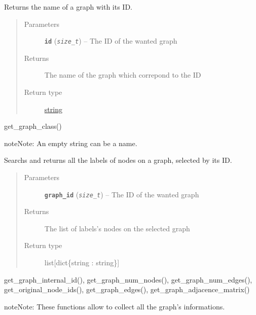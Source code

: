 \documentclass[letterpaper,10pt,english]{sphinxmanual}
\begin{document}

\begin{fulllineitems}
\label{doc:gedlibpy.get_graph_name}
Returns the name of a graph with its ID.
\begin{quote}\begin{description}
\item[{Parameters}] \leavevmode
\textbf{\texttt{id}} (\emph{\texttt{size\_t}}) -- The ID of the wanted graph

\item[{Returns}] \leavevmode
The name of the graph which correpond to the ID

\item[{Return type}] \leavevmode
\href{https://docs.python.org/3/library/string.html\#module-string}{string}

\end{description}\end{quote}




get\_graph\_class()



\begin{notice}{note}{Note:}
An empty string can be a name.
\end{notice}

\end{fulllineitems}


\begin{fulllineitems}
\label{doc:gedlibpy.get_graph_node_labels}
Searchs and returns all the labels of nodes on a graph, selected by its ID.
\begin{quote}\begin{description}
\item[{Parameters}] \leavevmode
\textbf{\texttt{graph\_id}} (\emph{\texttt{size\_t}}) -- The ID of the wanted graph

\item[{Returns}] \leavevmode
The list of labels's nodes on the selected graph

\item[{Return type}] \leavevmode
list{[}dict\{string : string\}{]}

\end{description}\end{quote}




get\_graph\_internal\_id(), get\_graph\_num\_nodes(), get\_graph\_num\_edges(), get\_original\_node\_ids(), get\_graph\_edges(), get\_graph\_adjacence\_matrix()



\begin{notice}{note}{Note:}
These functions allow to collect all the graph's informations.
\end{notice}

\end{fulllineitems}
\end{document}
